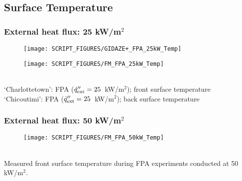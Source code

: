 \begin{landscape}
\newpage
\subsection{Surface Temperature}
\label{Gas_Temp}
\subsubsection{External heat flux: 25 kW/m$^2$}
\begin{minipage}{0.65\textwidth}
\begin{figure}[H]
{\texttt{[image: SCRIPT\_FIGURES/GIDAZE+\_FPA\_25kW\_Temp]}}\\
\end{figure}
\end{minipage}

\begin{minipage}{0.35\textwidth}
\begin{figure}[H]
{\texttt{[image: SCRIPT\_FIGURES/FM\_FPA\_25kW\_Temp]}}\\
\end{figure}
\end{minipage}\\
‘Charlottetown’:  FPA ($\dot{q}_{\rm ext}'' = 25$~kW/m$^2$); front surface temperature \\
‘Chicoutimi’:   FPA ($\dot{q}_{\rm ext}'' = 25$~kW/m$^2$); back surface temperature \\
\vfill


\newpage
\subsubsection{External heat flux: 50 kW/m$^2$}
\begin{minipage}{0.65\textwidth}
\begin{figure}[H]
{\texttt{[image: SCRIPT\_FIGURES/FM\_FPA\_50kW\_Temp]}}\\
\end{figure}
\end{minipage}\\
Measured front surface temperature during FPA experiments conducted at 50 kW/m$^2$. 
\vfill
\newpage

\end{landscape}
